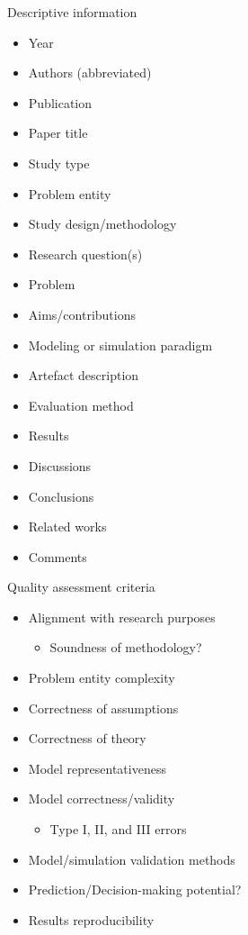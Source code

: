 \documentclass{article}
\begin{document}
Descriptive information
\begin{itemize}
    \item Year
    \item Authors (abbreviated)
    \item Publication
    \item Paper title
    \item Study type
    \item Problem entity
    \item Study design/methodology
    \item Research question(s)
    \item Problem
    \item Aims/contributions
    \item Modeling or simulation paradigm
    \item Artefact description
    \item Evaluation method
    \item Results
    \item Discussions
    \item Conclusions
    \item Related works
    \item Comments
\end{itemize}

\noindent Quality assessment criteria

\begin{itemize}
    \item Alignment with research purposes \cite{law2015}
        \begin{itemize}
            \item Soundness of methodology? \cite[pp.~66-70]{law2015}\cite{sargent2010}
        \end{itemize}
    \item Problem entity complexity \cite{law2015}
    \item Correctness of assumptions \cite{sargent2015}
    \item Correctness of theory \cite{sargent2015}
    \item Model representativeness \cite{sargent2015}
    \item Model correctness/validity \cite{sargent2015, law2008}
        \begin{itemize}
            \item Type I, II, and III errors \cite{balci1998}
        \end{itemize}
    \item Model/simulation validation methods \cite{sargent2015}
    \item Prediction/Decision-making potential? \cite{law2015}
    \item Results reproducibility \cite{taylor2018}
\end{itemize}
\end{document}
